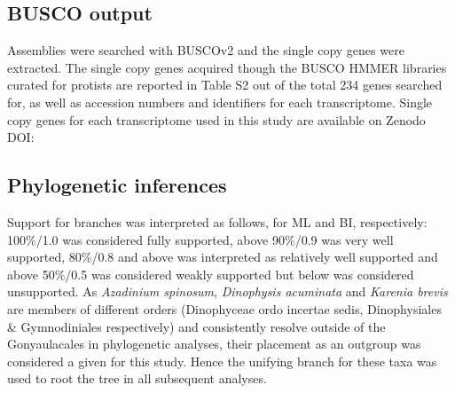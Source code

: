 \documentclass[12pt]{article}
\begin{document}
\subsection*{BUSCO output}
Assemblies were searched with BUSCOv2 and the single copy genes were extracted. 
The single copy genes acquired though the BUSCO HMMER libraries curated for protists are reported in Table S2 out of the total 234 genes searched for, as well as accession numbers and identifiers for each transcriptome. 
Single copy genes for each transcriptome used in this study are available on Zenodo DOI:

\subsection*{Phylogenetic inferences}
Support for branches was interpreted as follows, for ML and BI, respectively: 100\%/1.0 was considered fully supported, above 90\%/0.9 was very well supported, 80\%/0.8 and above was interpreted as relatively well supported and above 50\%/0.5 was considered weakly supported but below was considered unsupported.
As \emph{Azadinium spinosum}, \emph{Dinophysis acuminata} and \emph{Karenia brevis} are members of different orders (Dinophyceae ordo incertae sedis, Dinophysiales \& Gymnodiniales respectively) and consistently resolve outside of the Gonyaulacales in phylogenetic analyses, their placement as an outgroup was considered a given for this study. 
Hence the unifying branch for these taxa was used to root the tree in all subsequent analyses.
\end{document}
